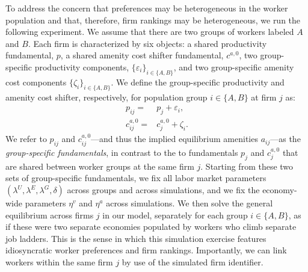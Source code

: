 To address the concern that preferences may be heterogeneous in the worker population and that, therefore, firm rankings may be heterogeneous, we run the following experiment. We assume that there are two groups of workers labeled $A$ and $B$. Each firm is characterized by six objects: a shared productivity fundamental, $p$, a shared amenity cost shifter fundamental, $c^{a, 0}$, two group-specific productivity components, $\{ \varepsilon_{i} \}_{i \in \{ A, B \}}$, and two group-specific amenity cost components $\{ \zeta_{i} \}_{i \in \{ A, B \}}$. We define the group-specific productivity and amenity cost shifter, respectively, for population group $i \in \{ A, B \}$ at firm $j$ as:
%
\begin{align*}
    p_{ij} = & p_{j} + \varepsilon_{i}, \\
    c_{ij}^{a, 0} = & c_{j}^{a, 0} + \zeta_{i}.
\end{align*}
%
We refer to $p_{ij}$ and $c_{ij}^{a, 0}$---and thus the implied equilibrium amenities $a_{ij}$---as the \emph{group-specific fundamentals}, in contrast to the to fundamentals $p_{j}$ and $c_{j}^{a, 0}$ that are shared between worker groups at the same firm $j$. Starting from these two sets of group-specific fundamentals, we fix all labor market parameters $(\lambda^{U}, \lambda^{E}, \lambda^{G}, \delta)$ across groups and across simulations, and we fix the economy-wide parameters $\eta^{v}$ and $\eta^{a}$ across simulations. We then solve the general equilibrium across firms $j$ in our model, separately for each group $i \in \{A, B\}$, as if these were two separate economies populated by workers who climb separate job ladders. This is the sense in which this simulation exercise features idiosyncratic worker preferences and firm rankings. Importantly, we can link workers within the same firm $j$ by use of the simulated firm identifier.

